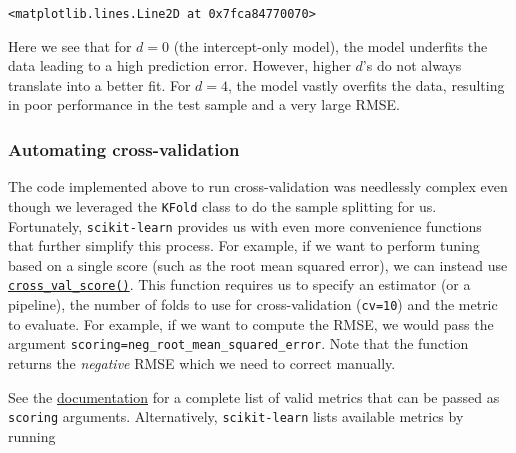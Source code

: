 \documentclass{scrartcl}
\makeatletter
\newcommand{\boxspacing}{\kern\kvtcb@left@rule\kern\kvtcb@boxsep}
\newcommand{\prompt}[4]{
        {\ttfamily\llap{{\color{#2}[#3]:\hspace{3pt}#4}}\vspace{-\baselineskip}}
    }
\makeatother
\begin{document}
            \begin{tcolorbox}[breakable, size=fbox, boxrule=.5pt, pad at break*=1mm, opacityfill=0]
\prompt{Out}{outcolor}{30}{\boxspacing}
\begin{Verbatim}[commandchars=\\\{\}]
<matplotlib.lines.Line2D at 0x7fca84770070>
\end{Verbatim}
\end{tcolorbox}
        
    \begin{center}
    \end{center}
    
    Here we see that for \(d=0\) (the intercept-only model), the model
underfits the data leading to a high prediction error. However, higher
\(d\)'s do not always translate into a better fit. For \(d = 4\), the
model vastly overfits the data, resulting in poor performance in the
test sample and a very large RMSE.

    \hypertarget{automating-cross-validation}{%
\subsubsection*{Automating
cross-validation}\label{automating-cross-validation}}

The code implemented above to run cross-validation was needlessly
complex even though we leveraged the \texttt{KFold} class to do the
sample splitting for us. Fortunately, \texttt{scikit-learn} provides us
with even more convenience functions that further simplify this process.
For example, if we want to perform tuning based on a single score (such
as the root mean squared error), we can instead use
\href{https://scikit-learn.org/stable/modules/generated/sklearn.model_selection.cross_val_score.html}{\texttt{cross\_val\_score()}}.
This function requires us to specify an estimator (or a pipeline), the
number of folds to use for cross-validation (\texttt{cv=10}) and the
metric to evaluate. For example, if we want to compute the RMSE, we
would pass the argument
\texttt{scoring=\textquotesingle{}neg\_root\_mean\_squared\_error\textquotesingle{}}.
Note that the function returns the \emph{negative} RMSE which we need to
correct manually.

See the
\href{https://scikit-learn.org/stable/modules/model_evaluation.html\#scoring-parameter}{documentation}
for a complete list of valid metrics that can be passed as
\texttt{scoring} arguments. Alternatively, \texttt{scikit-learn} lists
available metrics by running
\end{document}
